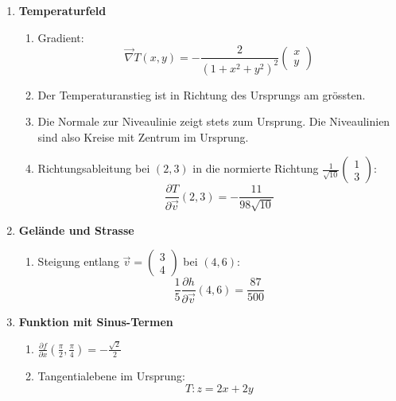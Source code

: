\begin{enumerate}
	\item \textbf{Temperaturfeld}
	      \begin{enumerate}
		      \item Gradient:
		            \[
			            \vec{\nabla} T(x, y) = -\frac{2}{(1 + x^2 + y^2)^2} \begin{pmatrix} x \\ y \end{pmatrix}
		            \]
		      \item Der Temperaturanstieg ist in Richtung des Ursprungs am grössten.
		      \item Die Normale zur Niveaulinie zeigt stets zum Ursprung. Die Niveaulinien sind also Kreise mit Zentrum im Ursprung.
		      \item Richtungsableitung bei \( (2, 3) \) in die normierte Richtung \( \frac{1}{\sqrt{10}} \begin{pmatrix} 1 \\ 3 \end{pmatrix} \):
		            \[
			            \frac{\partial T}{\partial \vec{v}}(2, 3) = -\frac{11}{98\sqrt{10}}
		            \]
	      \end{enumerate}

	\item \textbf{Gelände und Strasse}
	      \begin{enumerate}
		      \item Steigung entlang \( \vec{v} = \begin{pmatrix} 3 \\ 4 \end{pmatrix} \) bei \( (4, 6) \):
		            \[
			            \frac{1}{5} \frac{\partial h}{\partial \vec{v}}(4, 6) = \frac{87}{500}
		            \]
	      \end{enumerate}

	\item \textbf{Funktion mit Sinus-Termen}
	      \begin{enumerate}
		      \item \(\frac{\partial f}{\partial x} \left(\frac{\pi}{2}, \frac{\pi}{4}\right) = -\frac{\sqrt{2}}{2} \)
		      \item Tangentialebene im Ursprung:
		            \[
			            T: z = 2x + 2y
		            \]
	      \end{enumerate}
\end{enumerate}
